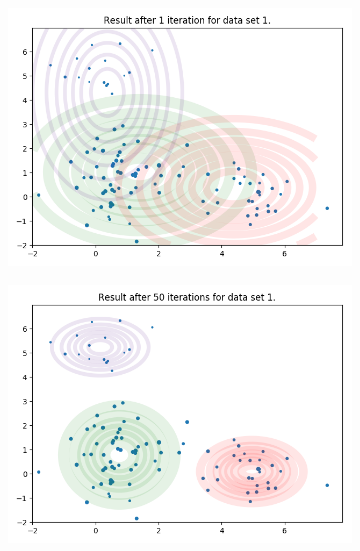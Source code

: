 \documentclass[11pt]{extarticle}
\newcommand{\0}{\mathbf{0}}
\renewcommand{\(}{\left(}
\renewcommand{\)}{\right)}
\theoremstyle{definition}
\begin{document}
\begin{figure}[!ht]
	\centering
	\begin{subfigure}{.49\textwidth}
		\centering
		\includegraphics[width=\linewidth]{2_6_EM1_1}
	\end{subfigure}
	\begin{subfigure}{.49\textwidth}
		\centering
		\includegraphics[width=\linewidth]{2_6_EM1_50}
	\end{subfigure}
	\begin{subfigure}{.49\textwidth}
		\centering

\end{subfigure}
\end{figure}
\end{document}
